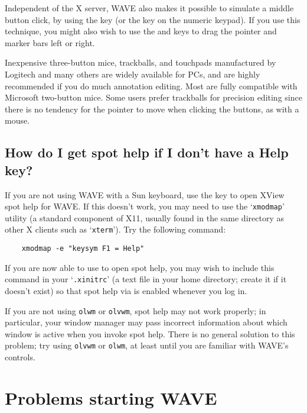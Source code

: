 \documentclass[twoside]{book}
\newcommand{\keycap}[1]{\cornersize{.5}\Ovalbox{\small\sf #1}}
\newcommand{\WAVE}{{\sf WAVE}\xspace}
\begin{document}
Independent of the X server, \WAVE{} also makes it possible to simulate a
middle button click, by using the \keycap{F2} key (or the \keycap{5} key
on the numeric keypad).  If you use this technique, you might also wish to
use the \keycap{F3} and \keycap{F4} keys to drag the pointer and marker bars
left or right.

Inexpensive three-button mice, trackballs, and touchpads manufactured
by Logitech and many others are widely available for PCs, and are
highly recommended if you do much annotation editing.  Most are fully
compatible with Microsoft two-button mice.  Some users prefer
trackballs for precision editing since there is no tendency for the
pointer to move when clicking the buttons, as with a mouse.

\subsection{How do I get spot help if I don't have a {\sf Help} key?}

\label{faq:no-help-key}
If you are not using \WAVE{} with a Sun keyboard, use the \keycap{F1}
key to open XView
spot help for \WAVE{}.  If this doesn't work, you
may need to use the `{\tt xmodmap}' utility (a standard component of
X11, usually found in the same directory as other X clients such as
`{\tt xterm}').  Try the following command:

\begin{verbatim}
	xmodmap -e "keysym F1 = Help"
\end{verbatim}

If you are now able to use \keycap{F1} to open spot help, you may wish
to include this command in your `{\tt .xinitrc}' (a text file in your
home directory; create it if it doesn't exist) so that spot help via
\keycap{F1} is enabled whenever you log in.

If you are not using {\tt olwm} or {\tt olvwm},
spot help may not work
properly; in particular, your window manager may pass incorrect
information about which window is active when you invoke spot help.
There is no general solution to this problem; try using {\tt olvwm} or
{\tt olwm}, at least until you are familiar with \WAVE{}'s controls.

\section{Problems starting \WAVE{}}
\end{document}
